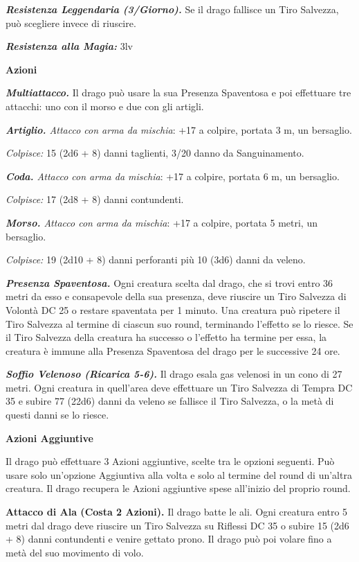 \begin{multicols}{2}
{\emph{\textbf{Resistenza Leggendaria (3/Giorno).}} Se il drago fallisce un Tiro Salvezza, può scegliere invece di riuscire.

\emph{\textbf{Resistenza alla Magia:}} 3lv

\textbf{Azioni}

\emph{\textbf{Multiattacco.}} Il drago può usare la sua Presenza Spaventosa e poi effettuare tre attacchi: uno con il morso e due con gli artigli.

\emph{\textbf{Artiglio.} Attacco con arma da mischia}: +17 a colpire, portata 3 m, un bersaglio.

\emph{Colpisce:} 15 (2d6 + 8) danni taglienti, 3/20 danno da Sanguinamento.

\emph{\textbf{Coda.} Attacco con arma da mischia}: +17 a colpire, portata 6 m, un bersaglio.

\emph{Colpisce:} 17 (2d8 + 8) danni contundenti.

\emph{\textbf{Morso.} Attacco con arma da mischia}: +17 a colpire, portata 5 metri, un bersaglio.

\emph{Colpisce:} 19 (2d10 + 8) danni perforanti più 10 (3d6) danni da veleno.

\emph{\textbf{Presenza Spaventosa.}} Ogni creatura scelta dal drago, che si trovi entro 36 metri da esso e consapevole della sua presenza, deve riuscire un Tiro Salvezza di Volontà DC 25 o restare spaventata per 1 minuto. Una creatura può ripetere il Tiro Salvezza al termine di ciascun suo round, terminando l'effetto se lo riesce. Se il Tiro Salvezza della creatura ha successo o l'effetto ha termine per essa, la creatura è immune alla Presenza Spaventosa del drago per le successive 24 ore.

\emph{\textbf{Soffio Velenoso (Ricarica 5-6).}} Il drago esala gas velenosi in un cono di 27 metri. Ogni creatura in quell'area deve effettuare un Tiro Salvezza di Tempra DC 35 e subire 77 (22d6) danni da veleno se fallisce il Tiro Salvezza, o la metà di questi danni se lo riesce.

\textbf{Azioni Aggiuntive}

Il drago può effettuare 3 Azioni aggiuntive, scelte tra le opzioni seguenti. Può usare solo un'opzione Aggiuntiva alla volta e solo al termine del round di un'altra creatura. Il drago recupera le Azioni aggiuntive spese all'inizio del proprio round.

\textbf{Attacco di Ala (Costa 2 Azioni).} Il drago batte le ali. Ogni creatura entro 5 metri dal drago deve riuscire un Tiro Salvezza su Riflessi DC 35 o subire 15 (2d6 + 8) danni contundenti e venire gettato prono. Il drago può poi volare fino a metà del suo movimento di volo.

}
\end{multicols}
